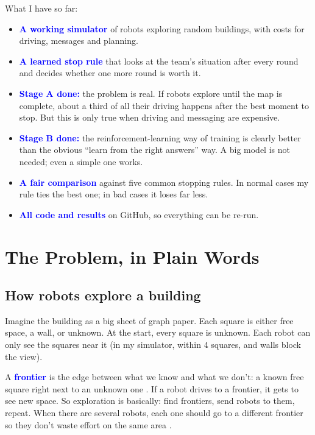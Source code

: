 \documentclass[11pt,a4paper]{article}
\newcommand{\key}[1]{\textcolor{blue}{\textbf{#1}}}
\begin{document}
What I have so far:
\begin{itemize}
  \item \key{A working simulator} of robots exploring random buildings, with costs for driving, messages and planning.
  \item \key{A learned stop rule} that looks at the team's situation after every round and decides whether one more round is worth it.
  \item \key{Stage A done:} the problem is real. If robots explore until the map is complete, about a third of all their driving happens after the best moment to stop. But this is only true when driving and messaging are expensive.
  \item \key{Stage B done:} the reinforcement-learning way of training is clearly better than the obvious ``learn from the right answers'' way. A big model is not needed; even a simple one works.
  \item \key{A fair comparison} against five common stopping rules. In normal cases my rule ties the best one; in bad cases it loses far less.
  \item \key{All code and results} on GitHub, so everything can be re-run.
\end{itemize}

\section{The Problem, in Plain Words}

\subsection{How robots explore a building}

Imagine the building as a big sheet of graph paper. Each square is either free space, a wall, or unknown. At the start, every square is unknown. Each robot can only see the squares near it (in my simulator, within 4 squares, and walls block the view).

A \key{frontier} is the edge between what we know and what we don't: a known free square right next to an unknown one \cite{yamauchi1997}. If a robot drives to a frontier, it gets to see new space. So exploration is basically: find frontiers, send robots to them, repeat. When there are several robots, each one should go to a different frontier so they don't waste effort on the same area \cite{burgard2005}.
\end{document}
